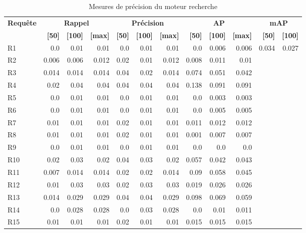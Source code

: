 \begin{table}[H]
\centering
\begin{tabular}{l|rrr|rrr|rrr|rr}
\toprule
\textbf{Requête} & \multicolumn{3}{c}{\textbf{Rappel}} & \multicolumn{3}{c}{\textbf{Précision}} & \multicolumn{3}{c}{\textbf{AP}} & \multicolumn{2}{c}{\textbf{mAP}} \\
 & \textbf{[50]} & \textbf{[100]} & \textbf{[max]} & \textbf{[50]} & \textbf{[100]} & \textbf{[max]} & \textbf{[50]} & \textbf{[100]} & \textbf{[max]} & \textbf{[50]} & \textbf{[100]} \\
\midrule
R1 & 0.0 & 0.01 & 0.01 & 0.0 & 0.01 & 0.01 & 0.0 & 0.006 & 0.006 & \multirow{15}{*}{0.034} & \multirow{15}{*}{0.027} \\
R2 & 0.006 & 0.006 & 0.012 & 0.02 & 0.01 & 0.012 & 0.008 & 0.011 & 0.01 \\
R3 & 0.014 & 0.014 & 0.014 & 0.04 & 0.02 & 0.014 & 0.074 & 0.051 & 0.042 \\
R4 & 0.02 & 0.04 & 0.04 & 0.04 & 0.04 & 0.04 & 0.138 & 0.091 & 0.091 \\
R5 & 0.0 & 0.01 & 0.01 & 0.0 & 0.01 & 0.01 & 0.0 & 0.003 & 0.003 \\
R6 & 0.0 & 0.01 & 0.01 & 0.0 & 0.01 & 0.01 & 0.0 & 0.005 & 0.005 \\
R7 & 0.01 & 0.01 & 0.01 & 0.02 & 0.01 & 0.01 & 0.011 & 0.012 & 0.012 \\
R8 & 0.01 & 0.01 & 0.01 & 0.02 & 0.01 & 0.01 & 0.001 & 0.007 & 0.007 \\
R9 & 0.0 & 0.01 & 0.01 & 0.0 & 0.01 & 0.01 & 0.0 & 0.0 & 0.0 \\
R10 & 0.02 & 0.03 & 0.02 & 0.04 & 0.03 & 0.02 & 0.057 & 0.042 & 0.043 \\
R11 & 0.007 & 0.014 & 0.014 & 0.02 & 0.02 & 0.014 & 0.09 & 0.058 & 0.045 \\
R12 & 0.01 & 0.03 & 0.03 & 0.02 & 0.03 & 0.03 & 0.019 & 0.026 & 0.026 \\
R13 & 0.014 & 0.029 & 0.029 & 0.04 & 0.04 & 0.029 & 0.098 & 0.069 & 0.059 \\
R14 & 0.0 & 0.028 & 0.028 & 0.0 & 0.03 & 0.028 & 0.0 & 0.01 & 0.011 \\
R15 & 0.01 & 0.01 & 0.01 & 0.02 & 0.01 & 0.01 & 0.015 & 0.015 & 0.015 \\
\bottomrule
\end{tabular}
\caption{Mesures de précision du moteur recherche}
\label{tab:results}
\end{table}
